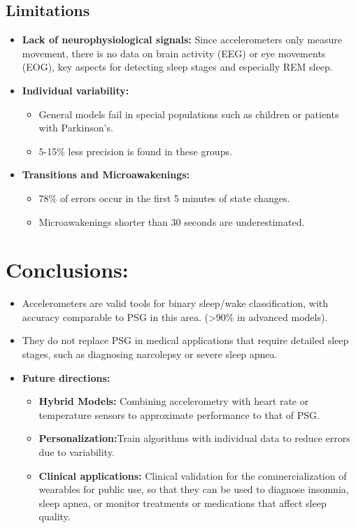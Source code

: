 \documentclass[conference]{IEEEtran}
\begin{document}
\subsection{Limitations}

\begin{itemize}
	\item \textbf{Lack of neurophysiological signals:} Since accelerometers only measure movement, there is no data on brain activity (EEG) or eye movements (EOG), key aspects for detecting sleep stages and especially REM sleep.
	\item \textbf{Individual variability:} 
            \begin{itemize}
		      \item General models fail in special populations such as children or patients with Parkinson's.
		      \item 5-15\% less precision is found in these groups.
	      \end{itemize}
    \item \textbf{Transitions and Microawakenings:} 
            \begin{itemize}
		      \item 78\% of errors occur in the first 5 minutes of state changes.
		      \item Microawakenings shorter than 30 seconds are underestimated.
	      \end{itemize}
\end{itemize}

\section{Conclusions: }
    
    \begin{itemize}
		\item Accelerometers are valid tools for binary sleep/wake classification, with accuracy comparable to PSG in this area. (>90\% in advanced models).
		\item They do not replace PSG in medical applications that require detailed sleep stages, such as diagnosing narcolepsy or severe sleep apnea. 
        \item \textbf{Future directions:} 
        \begin{itemize}
		      \item \textbf{Hybrid Models:} Combining accelerometry with heart rate or temperature sensors to approximate performance to that of PSG.
		      \item \textbf{Personalization:}Train algorithms with individual data to reduce errors due to variability.
                \item \textbf{Clinical applications:} Clinical validation for the commercialization of wearables for public use, so that they can be used to diagnose insomnia, sleep apnea, or monitor treatments or medications that affect sleep quality.
	      \end{itemize}
	\end{itemize}
\end{document}
